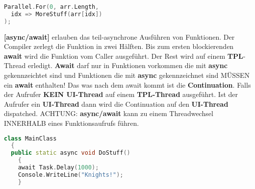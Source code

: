 \documentclass[8pt]{extarticle}
\let\oldtextbf\textbf
\renewcommand{\textbf}{\tiny\oldtextbf}
\begin{document}
\begin{multicols*}{5}
\begin{lstlisting}[language=c++]
Parallel.For(0, arr.Length,
  idx => MoreStuff(arr[idx])
);
\end{lstlisting}
\textbf{[async/await]} erlauben das teil-asynchrone Ausführen von Funktionen. Der Compiler zerlegt die Funktion in zwei Hälften. Bis zum ersten blockierenden \textbf{await} wird die Funktion vom Caller ausgeführt. Der Rest wird auf einem \textbf{TPL}-Thread erledigt. \textbf{Await} darf nur in Funktionen vorkommen die mit \textbf{async} gekennzeichtet sind und Funktionen die mit \textbf{async} gekennzeichnet sind MÜSSEN ein \textbf{await} enthalten! Das was nach dem await kommt ist die \textbf{Continuation}. Falls der Aufrufer \textbf{KEIN UI-Thread} auf einem \textbf{TPL-Thread} ausgeführt. Ist der Aufrufer ein \textbf{UI-Thread} dann wird die Continuation auf den \textbf{UI-Thread} dispatched. ACHTUNG: \textbf{async/await} kann zu einem Threadwechsel INNERHALB eines Funktionsaufrufs führen.
\begin{lstlisting}[language=c++]
class MainClass
  {
  public static async void DoStuff()
    {
    await Task.Delay(1000);
    Console.WriteLine("Knights!");
    }


\end{lstlisting}
\end{multicols*}
\end{document}
